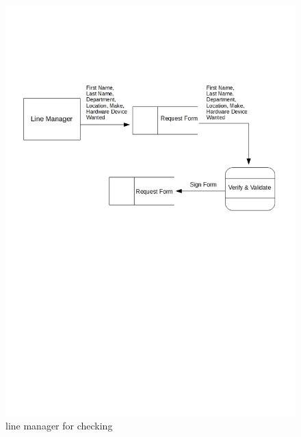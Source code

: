\begin{figure}[H]
\includegraphics[width=\textwidth]{dtd1.jpg}
\caption{line manager for checking} \label{Page1Interview}
\end{figure}

